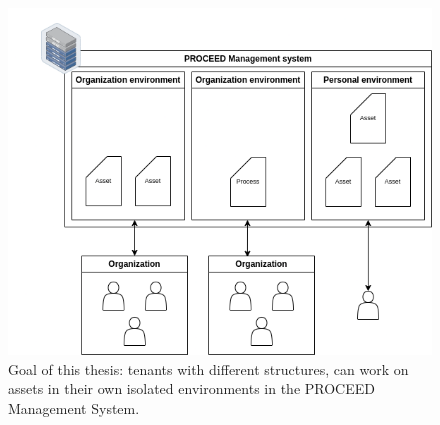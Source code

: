 
\begin{figure}[H]
	\centering
	\includegraphics[scale=0.45]{images/proceed-workspaces-v2.drawio.png}
	\caption{Goal of this thesis: tenants with different structures, can work on assets in their own isolated environments in
		the PROCEED Management System.}
	\label{fig:proceed-envitonments-overview}
\end{figure}


%
%

